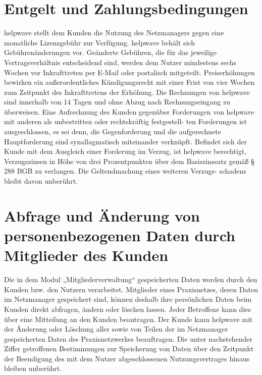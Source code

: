 \documentclass[10pt]{article}
\begin{document}
\section{Entgelt und Zahlungsbedingungen}
helpwave stellt dem Kunden die Nutzung des Netzmanagers gegen eine monatliche Lizenzgebühr zur Verfügung. helpwave
behält sich Gebührenänderungen vor. Geänderte Gebühren, die für das jeweilige Vertragsverhältnis entscheidend sind, werden dem Nutzer mindestens sechs Wochen vor Inkrafttreten per E-Mail oder postalisch mitgeteilt. Preiserhöhungen bewirken ein außerordentliches Kündigungsrecht mit einer Frist von vier Wochen zum Zeitpunkt des Inkrafttretens der Erhöhung.
Die Rechnungen von helpwave sind innerhalb von 14 Tagen und ohne Abzug nach Rechnungseingang zu überweisen. Eine
Aufrechnung des Kunden gegenüber Forderungen von helpwave mit anderen als unbestritten oder rechtskräftig festgestell-
ten Forderungen ist ausgeschlossen, es sei denn, die Gegenforderung und die aufgerechnete Hauptforderung sind synallagmatisch miteinander verknüpft.
Befindet sich der Kunde mit dem Ausgleich einer Forderung im Verzug, ist helpwave berechtigt, Verzugszinsen in Höhe von
drei Prozentpunkten über dem Basiszinssatz gemäß § 288 BGB zu verlangen. Die Geltendmachung eines weiteren Verzugs-
schadens bleibt davon unberührt.

\section{Abfrage und Änderung von personenbezogenen Daten durch Mitglieder des Kunden}
Die in dem Modul „Mitgliederverwaltung“ gespeicherten Daten werden durch den Kunden bzw. den Nutzern verarbeitet.
Mitglieder eines Praxisnetzes, deren Daten im Netzmanager gespeichert sind, können deshalb ihre persönlichen Daten beim
Kunden direkt abfragen, ändern oder löschen lassen. Jeder Betroffene kann dies über eine Mitteilung an den Kunden beantragen. Der Kunde kann helpwave mit der Änderung oder Löschung aller sowie von Teilen der im Netzmanager gespeicherten Daten des Praxisnetzwerkes beauftragen. Die unter nachstehender Ziffer getroffenen Bestimmungen zur Speicherung von Daten über den Zeitpunkt der Beendigung des mit dem Nutzer abgeschlossenen Nutzungsvertrages hinaus bleiben unberührt.
\end{document}
